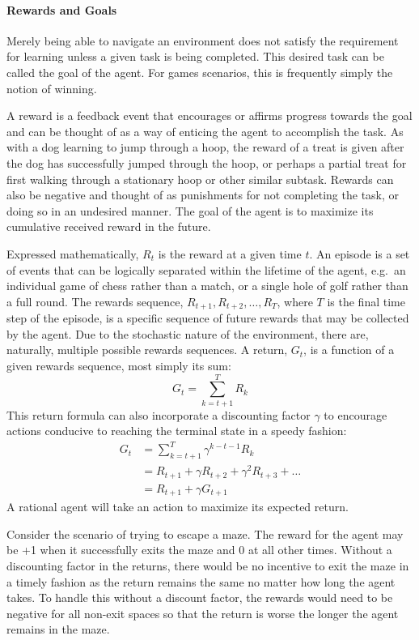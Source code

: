 \paragraph*{Rewards and Goals}

Merely being able to navigate an environment does not satisfy the
requirement for learning unless a given task is being completed.
%
This desired task can be called the goal of the agent.
%
For games scenarios,
this is frequently simply the notion of winning.

A reward is a feedback event that encourages or affirms progress
towards the goal
and 
can be thought of as a way of enticing the agent to accomplish the task.
%
As with a dog learning to jump through a hoop,
the reward of a treat is given after the dog has successfully jumped
through the hoop,
or perhaps a partial treat for first walking through a stationary hoop
or other similar subtask.
%
Rewards can also be negative
and thought of as punishments for not completing the task,
or doing so in an undesired manner.
%
The goal of the agent is to maximize its cumulative received reward
in the future.

Expressed mathematically, $R_t$ is the reward at a given time $t$.
%
An episode is a set of events
that can be logically separated within the lifetime of the agent,
e.g.\ an individual game of chess rather than a match,
or a single hole of golf rather than a full round.
%
The rewards sequence,
$R_{t+1}, R_{t+2}, \ldots, R_{T}$,
where $T$ is the final time step of the episode,
is a specific sequence of future rewards that may be collected by the agent.
%
Due to the stochastic nature of the environment,
there are, naturally, multiple possible rewards sequences.
%
A return, $G_t$,
is a function of a given rewards sequence,
most simply its sum:
\[
	G_t = \sum_{k=t+1}^{T} R_k
\]
%
This return formula can also incorporate a discounting factor $\gamma$ to
encourage actions conducive to reaching the terminal state in a speedy fashion:
\begin{align*}
	G_t &= \sum_{k=t+1}^{T} \gamma^{k-t-1} R_k \\
		&= R_{t+1} + \gamma R_{t+2} + \gamma^2 R_{t+3} + \ldots \\
		&= R_{t+1} + \gamma G_{t+1}
\end{align*}
%
A rational agent will take an action to maximize its expected return.

Consider the scenario of trying to escape a maze.
%
The reward for the agent may be +1 when it successfully exits the maze
and 0 at all other times.
%
Without a discounting factor in the returns,
there would be no incentive to exit the maze in a timely fashion
as the return remains the same no matter how long the agent takes.
%
To handle this without a discount factor,
the rewards would need to be negative for all non-exit spaces
so that the return is worse the longer the agent remains in the maze.

